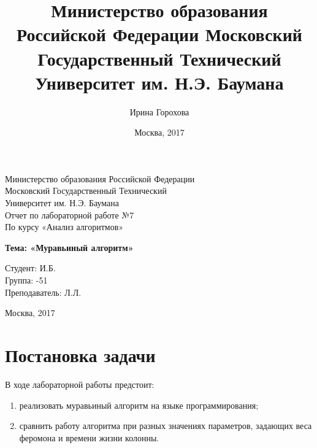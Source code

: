 \documentclass[a4paper,12pt]{article}
\title{Министерство образования Российской Федерации
Московский Государственный Технический Университет им. Н.Э. Баумана}
\author{Ирина Горохова}
\date{Москва, 2017}
\begin{document}
\thispagestyle{empty}

\begin{figure}[th]
\noindent{}
\end{figure}

\begin{center}
    {\Large Министерство образования Российской Федерации\\
Московский Государственный Технический\\ Университет им. Н.Э. Баумана \\[66pt]
Отчет по лабораторной работе №7 \\
По курсу «Анализ алгоритмов»}
\end{center}

\begin{center}
    {\LARGE \textbf{Тема: «Муравьиный алгоритм»\\[90pt]}}
\end{center}

\begin{flushright}
Студент: { И.Б.}\\ Группа: {-51}\\[20pt] 
Преподаватель: { Л.Л.}\\[80pt]
\end{flushright}

\begin{center}
    {\Large Москва, 2017}
\end{center}

\newpage

\tableofcontents
\newpage
\section*{Постановка задачи}
В ходе лабораторной работы предстоит:
\begin{enumerate}
    \item реализовать муравьиный алгоритм на языке программирования;
    \item сравнить работу алгоритма при разных значениях параметров, задающих веса феромона и времени жизни колонны.
\end{enumerate}
\end{document}
